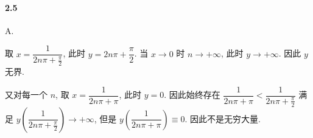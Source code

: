 \paragraph*{2.5} A.

取 $x = \dfrac{1}{2n\pi + \frac{\pi}{2}}$, 此时 $y = 2n\pi + \dfrac{\pi}{2}$. 当 $x\to 0$ 时 $n \to +\infty$, 此时 $y \to +\infty$. 因此 $y$ 无界.

又对每一个 $n$, 取 $x = \dfrac{1}{2n\pi + \pi}$, 此时 $y = 0$. 因此始终存在 $\dfrac{1}{2n\pi + \pi} < \dfrac{1}{2n\pi + \frac{\pi}{2}}$ 满足 $y\left(\dfrac{1}{2n\pi + \frac{\pi}{2}}\right) \to +\infty$, 但是 $y\left(\dfrac{1}{2n\pi + \pi}\right) \equiv 0$. 因此不是无穷大量.